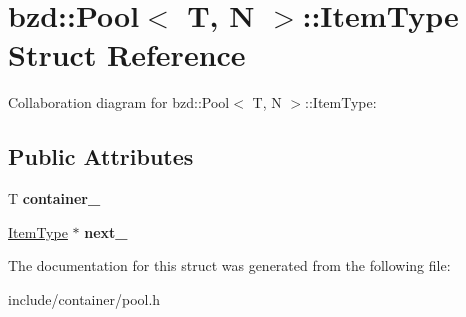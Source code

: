 \hypertarget{structbzd_1_1Pool_1_1ItemType}{}\section{bzd\+:\+:Pool$<$ T, N $>$\+:\+:Item\+Type Struct Reference}
\label{structbzd_1_1Pool_1_1ItemType}


Collaboration diagram for bzd\+:\+:Pool$<$ T, N $>$\+:\+:Item\+Type\+:
\subsection*{Public Attributes}
\begin{DoxyCompactItemize}
\item 
\mbox{\label{structbzd_1_1Pool_1_1ItemType_a6088206aedd6badf5d99132279328831}} 
T {\bfseries container\+\_\+}
\item 
\mbox{\label{structbzd_1_1Pool_1_1ItemType_a4aacd8ae74173a26684b7cf2ebc24624}} 
\hyperlink{structbzd_1_1Pool_1_1ItemType}{Item\+Type} $\ast$ {\bfseries next\+\_\+}
\end{DoxyCompactItemize}


The documentation for this struct was generated from the following file\+:\begin{DoxyCompactItemize}
\item 
include/container/pool.\+h\end{DoxyCompactItemize}
